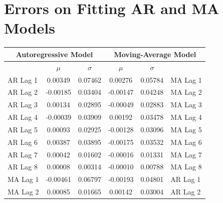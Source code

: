 \documentclass[oneside,12pt,openany]{book}
\begin{document}
	\appendices
		\chapter{Errors on Fitting AR and MA Models}
		
		\begin{table}[!ht]
			\centering
			\begin{tabular}{|l|c|c|c|c|l|}
				\hline
				\multicolumn{3}{|c|}{\textbf{Autoregressive Model}}   & \multicolumn{3}{c|}{\textbf{Moving-Average Model}}  \\ \hline
				\cellcolor{black} & $\mu$ & $\sigma$ & $\mu$ & $\sigma$ & \cellcolor{black}         \\ \hline
				AR Lag 1 & 0.00349                  & 0.07462                    & 0.00276                  & 0.05784                    & MA Lag 1 \\ \hline
				AR Lag 2 & -0.00185                 & 0.03404                    & -0.00147                 & 0.04248                    & MA Lag 2 \\ \hline
				AR Lag 3 & 0.00134                  & 0.02895                    & -0.00049                 & 0.02883                    & MA Lag 3 \\ \hline
				AR Lag 4 & -0.00039                 & 0.03909                    & 0.00192                  & 0.03478                    & MA Lag 4 \\ \hline
				AR Lag 5 & 0.00093                  & 0.02925                    & -0.00128                 & 0.03096                    & MA Lag 5 \\ \hline
				AR Lag 6 & 0.00387                  & 0.03895                    & -0.00175                 & 0.03532                    & MA Lag 6 \\ \hline
				AR Lag 7 & 0.00042                  & 0.01602                    & -0.00016                 & 0.01331                    & MA Lag 7 \\ \hline
				AR Lag 8 & 0.00008                  & 0.00314                    & -0.00010                 & 0.00788                    & MA Lag 8 \\ \hline
				MA Lag 1 & -0.00461                 & 0.06797                    & -0.00193                 & 0.04801                    & AR Lag 1 \\ \hline
				MA Lag 2 & 0.00085                  & 0.01665                    & 0.00142                  & 0.03004                    & AR Lag 2 \\ \hline
			\end{tabular}
		\end{table}
	
\end{document}
